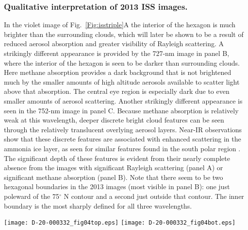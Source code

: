 \documentclass[article,11pt]{emulateapj}
\def\deg{$^\circ$ }
\begin{document}
\subsubsection{Qualitative interpretation of 2013 ISS images.}
In the violet image of Fig.\ \ref{Fig:isstriple}A the interior of
the hexagon is much brighter than the surrounding clouds, which will later
be shown to be a result of reduced aerosol absorption and greater visibility
of Rayleigh scattering. A strikingly different appearance is provided
by the 727-nm image in panel B, where the interior of the hexagon is seen to
be darker than surrounding clouds.  Here methane absorption provides a 
dark background that is not brightened much by the smaller amounts of high altitude aerosols 
available to scatter light above that absorption.  The central eye
region is especially dark due to even smaller amounts of aerosol scattering.  
Another strikingly different appearance is seen in the 752-nm image in panel C.  
Because methane absorption is
relatively weak at this wavelength, deeper discrete bright cloud features
can be seen through the relatively translucent overlying aerosol layers. Near-IR
observations show that these discrete features are associated
with enhanced scattering in the ammonia ice layer, as seen for similar
features found in the south polar region \citep{Sro2020spole}.
 The significant depth of these features is
evident from their nearly complete absence from the images with
significant Rayleigh scattering (panel A) or significant methane absorption
(panel B).  
Note that there seem to be two hexagonal boundaries in the 2013 images (most
visible in panel B): one just poleward of the 75\deg N contour and
a second just outside that contour.  The inner boundary is the
most sharply defined for all three wavelengths.    

\begin{figure*}[!ht]%
\texttt{[image: D-20-000332\_fig04top.eps]}
\texttt{[image: D-20-000332\_fig04bot.eps]}
\caption{Cassini/ISS wide-angle images taken on 13 June 2013, with an
  image scale of 69 km/pixel (A-C) and on 3 December 2016 (D-F), with
  image scales of 153 km (D, E) and 76.4 km (F).  Images D-F were also
  used in NASA press release PIA21053, which misidentified two of the
  filters and the date. We removed much of the brightness variationa
  across the images using a Minnaert correction in which the I/F at
  the pole (at image coordinates $x_p, y_p$) is unchanged, but away
  from the pole is corrected to $I/F(x,y)\times (\mu
  (x_p,y_p)/\mu(x,y))^{k-1}(\mu_0(x_p,y_p)/\mu_0(x,y))^k$, where $\mu$
  and $\mu_0$ are cosines of the observer and solar zenith angles
  respectively and $k$ chosen to be 0.82,
  0.9, and 0.85 for UV, MT2, and CB2 images respectively. Latitudes
  are planetocentric and the unlabeled contour is at 88\deg
  N.}
\label{Fig:isstriple}
\end{figure*}
\end{document}
